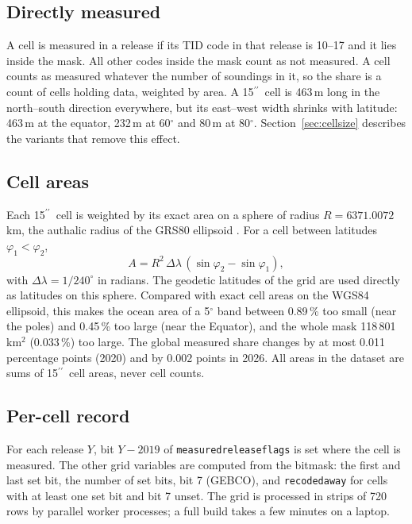 \documentclass[essd, manuscript]{copernicus}
\newcommand{\as}{$^{\prime\prime}$}      %
\renewcommand{\_}{\usorig\allowbreak}
\begin{document}
\subsection{Directly measured}

A cell is measured in a release if its TID code in that release is 10--17 and it lies inside the mask.
All other codes inside the mask count as not measured.
A cell counts as measured whatever the number of soundings in it, so the share is a count of cells holding data, weighted by area.
A 15\as\ cell is 463\,m long in the north--south direction everywhere, but its east--west width shrinks with latitude: 463\,m at the equator, 232\,m at 60$^\circ$ and 80\,m at 80$^\circ$.
Section~\ref{sec:cellsize} describes the variants that remove this effect.

\subsection{Cell areas}

Each 15\as\ cell is weighted by its exact area on a sphere of radius $R = 6371.0072$\,km, the authalic radius of the GRS80 ellipsoid \citep{moritz2000}.
For a cell between latitudes $\varphi_1 < \varphi_2$,
\begin{equation}
A = R^2\,\Delta\lambda\,(\sin\varphi_2 - \sin\varphi_1),
\label{eq:area}
\end{equation}
with $\Delta\lambda = 1/240^\circ$ in radians.
The geodetic latitudes of the grid are used directly as latitudes on this sphere.
Compared with exact cell areas on the WGS84 ellipsoid, this makes the ocean area of a 5$^\circ$ band between 0.89\,\% too small (near the poles) and 0.45\,\% too large (near the Equator), and the whole mask 118\,801\,km$^2$ (0.033\,\%) too large.
The global measured share changes by at most 0.011 percentage points (2020) and by 0.002 points in 2026.
All areas in the dataset are sums of 15\as\ cell areas, never cell counts.

\subsection{Per-cell record}

For each release $Y$, bit $Y - 2019$ of \texttt{measured\_release\_flags} is set where the cell is measured.
The other grid variables are computed from the bitmask: the first and last set bit, the number of set bits, bit 7 (GEBCO\_2026), and \texttt{recoded\_away} for cells with at least one set bit and bit 7 unset.
The grid is processed in strips of 720 rows by parallel worker processes; a full build takes a few minutes on a laptop.
\end{document}
